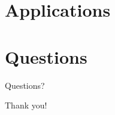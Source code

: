 \documentclass[pdf]{beamer}
\begin{document}
\begin{frame}
\tableofcontents[currentsection]
\end{frame}

\begin{frame}


\end{frame}




\section{Applications}

\begin{frame}
\tableofcontents[currentsection]
\end{frame}


\section{Questions}

\begin{frame}
\tableofcontents[currentsection]
\end{frame}

\begin{frame}
\centering
Questions?
\end{frame}

\begin{frame}
\centering
Thank you!
\end{frame}
\end{document}
